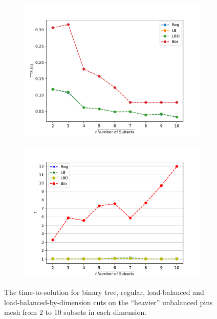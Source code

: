 \begin{figure}[h]
\centering
  \begin{subfigure}[t]{0.49\textwidth}
    \centering
\includegraphics[scale=0.55]{../../figures/more_sparse_comp.pdf}
  \end{subfigure}
  \begin{subfigure}[t]{0.49\textwidth}
    \centering
    \includegraphics[scale=0.55]{../../figures/more_sparse_metric_comp_bad.pdf}
  \end{subfigure}  
  \caption{The time-to-solution for binary tree, regular, load-balanced and load-balanced-by-dimension cuts on the ``heavier'' unbalanced pins mesh from 2 to 10 subsets in each dimension.}
  \label{ubp_comp2}
\end{figure}
